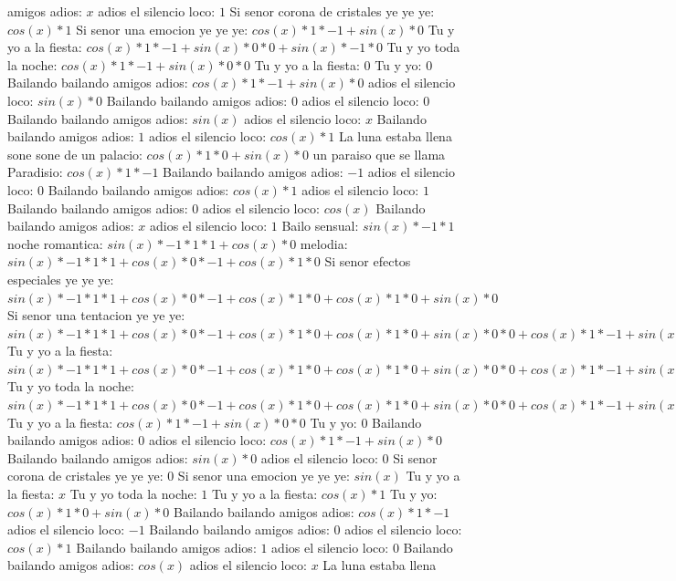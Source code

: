 \documentclass{article}
\begin{document}
amigos adios: $x$ adios el silencio loco: $1$  \newline Si senor corona de cristales ye ye ye: $cos(x)*1$ Si senor una emocion ye ye ye: $cos(x)*1*-1+sin(x)*0$ Tu y yo a la fiesta: ${cos(x)*1*-1+sin(x)*0}*0+sin(x)*-1*0$ Tu y yo toda la noche: ${cos(x)*1*-1+sin(x)*0}*0$ Tu y yo a la fiesta: $0$ Tu y yo: $0$  \newline Bailando bailando amigos adios: $cos(x)*1*-1+sin(x)*0$  \newline adios el silencio loco: $sin(x)*0$ Bailando bailando amigos adios: $0$ adios el silencio loco: $0$  \newline Bailando bailando amigos adios: $sin(x)$  \newline adios el silencio loco: $x$ Bailando bailando amigos adios: $1$  \newline adios el silencio loco: $cos(x)*1$ La luna estaba llena sone sone de un palacio: $cos(x)*1*0+sin(x)*0$ un paraiso que se llama Paradisio: $cos(x)*1*-1$ Bailando bailando amigos adios: $-1$ adios el silencio loco: $0$  \newline Bailando bailando amigos adios: $cos(x)*1$ adios el silencio loco: $1$ Bailando bailando amigos adios: $0$  \newline adios el silencio loco: $cos(x)$  \newline Bailando bailando amigos adios: $x$ adios el silencio loco: $1$  \newline Bailo sensual: $sin(x)*-1*1$ noche romantica: $sin(x)*-1*1*1+cos(x)*0$ melodia: ${sin(x)*-1*1*1+cos(x)*0}*-1+cos(x)*1*0$ Si senor efectos especiales ye ye ye: ${sin(x)*-1*1*1+cos(x)*0}*-1+cos(x)*1*0+cos(x)*1*0+sin(x)*0$ Si senor una tentacion ye ye ye: ${{sin(x)*-1*1*1+cos(x)*0}*-1+cos(x)*1*0+cos(x)*1*0+sin(x)*0}*0+{cos(x)*1*-1+sin(x)*0}*0$ Tu y yo a la fiesta: ${{sin(x)*-1*1*1+cos(x)*0}*-1+cos(x)*1*0+cos(x)*1*0+sin(x)*0}*0+{cos(x)*1*-1+sin(x)*0}*0+{cos(x)*1*-1+sin(x)*0}*0+sin(x)*-1*0$ Tu y yo toda la noche: ${{sin(x)*-1*1*1+cos(x)*0}*-1+cos(x)*1*0+cos(x)*1*0+sin(x)*0}*0+{cos(x)*1*-1+sin(x)*0}*0$  \newline Tu y yo a la fiesta: ${cos(x)*1*-1+sin(x)*0}*0$ Tu y yo: $0$ Bailando bailando amigos adios: $0$  \newline adios el silencio loco: $cos(x)*1*-1+sin(x)*0$  \newline Bailando bailando amigos adios: $sin(x)*0$ adios el silencio loco: $0$ Si senor corona de cristales ye ye ye: $0$  \newline Si senor una emocion ye ye ye: $sin(x)$  \newline Tu y yo a la fiesta: $x$ Tu y yo toda la noche: $1$  \newline Tu y yo a la fiesta: $cos(x)*1$ Tu y yo: $cos(x)*1*0+sin(x)*0$ Bailando bailando amigos adios: $cos(x)*1*-1$ adios el silencio loco: $-1$ Bailando bailando amigos adios: $0$  \newline adios el silencio loco: $cos(x)*1$ Bailando bailando amigos adios: $1$ adios el silencio loco: $0$  \newline Bailando bailando amigos adios: $cos(x)$  \newline adios el silencio loco: $x$ La luna estaba llena 
\end{document}
